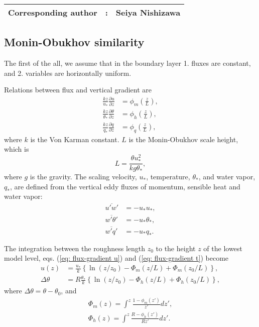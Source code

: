 {\bf \Large 
\begin{tabular}{ccc}
\hline
  Corresponding author & : & Seiya Nishizawa\\
\hline
\end{tabular}
}


\subsection{Monin-Obukhov similarity}
The first of the all,
we assume that in the boundary layer
1. fluxes are constant,
and 2. variables are horizontally uniform.


Relations between flux and vertical gradient are
\begin{align}
  \frac{kz}{u_*} \frac{\partial u}{\partial z} &= \phi_m\left(\frac{z}{L}\right), \label{eq: flux-gradient u} \\
  \frac{kz}{\theta_*} \frac{\partial \theta}{\partial z} &= \phi_h\left(\frac{z}{L}\right), \label{eq: flux-gradient t} \\
  \frac{kz}{q_*} \frac{\partial q}{\partial z} &= \phi_q\left(\frac{z}{L}\right),
\end{align}
where $k$ is the Von Karman constant.
$L$ is the Monin-Obukhov scale height, which is
\begin{equation}
  L = \frac{\theta u_*^2}{kg\theta_*},
\end{equation}
where $g$ is the gravity.
The scaling velocity, $u_*$, temperature, $\theta_*$,
and water vapor, $q_*$, are defined
from the vertical eddy fluxes of momentum, sensible heat and water vapor:
\begin{align}
  \overline{u'w'} &= -u_*u_*, \\
  \overline{w'\theta'} &= - u_*\theta_*, \\
  \overline{w'q'} &= - u_*q_*.
\end{align}

The integration between the roughness length $z_0$ to the height $z$ of the lowest model level, eqs. (\ref{eq: flux-gradient u}) and (\ref{eq: flux-gradient t}) become
\begin{align}
  u(z) &= \frac{u_*}{k} \left\{\ln(z/z_0)-\Phi_m(z/L)+\Phi_m(z_0/L)\right\}, \\
  \Delta\theta &= R\frac{\theta_*}{k} \left\{\ln(z/z_0)-\Phi_h(z/L)+\Phi_h(z_0/L)\right\},
\end{align}
where $\Delta\theta = \theta-\theta_0$,
and
\begin{align}
  \Phi_m(z) = \int^z \frac{1-\phi_m(z')}{z'} dz', \\
  \Phi_h(z) = \int^z \frac{R-\phi_h(z')}{R z'} dz'.
\end{align}


